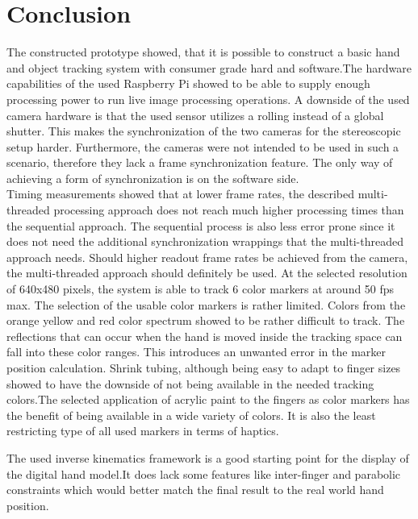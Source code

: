 \chapter{Conclusion}
The constructed prototype showed, that it is possible to construct a basic hand and object tracking system with consumer grade hard and software.The hardware capabilities of the used Raspberry Pi showed to be able to supply enough processing power to run live image processing operations. A downside of the used camera hardware is that the used sensor utilizes a rolling instead of a global shutter. This makes the synchronization of the two cameras for the stereoscopic setup harder. Furthermore, the cameras were not intended to be used in such a scenario, therefore they lack a frame synchronization feature. The only way of achieving a form of synchronization is on the software side.\\
Timing measurements showed that at lower frame rates, the described multi-threaded processing approach does not reach much higher processing times than the sequential approach. The sequential process is also less error prone since it does not need the additional synchronization wrappings that the multi-threaded approach needs. Should higher readout frame rates be achieved from the camera, the multi-threaded approach should definitely be used. At the selected resolution of 640x480 pixels, the system is able to track 6 color markers at around 50 fps max.
The selection of the usable color markers is rather limited. Colors from the orange yellow and red color spectrum showed to be rather difficult to track. The reflections that can occur when the hand is moved inside the tracking space can fall into these color ranges. This introduces an unwanted error in the marker position calculation.
Shrink tubing, although being easy to adapt to finger sizes showed to have the downside of not being available in the needed tracking colors.The selected application of acrylic paint to the fingers as color markers has the benefit of being available in a wide variety of colors. It is also the least restricting type of all used markers in terms of haptics.

The used inverse kinematics framework is  a good starting point for the display of the digital hand model.It does lack some features like inter-finger and parabolic constraints which would better match the final result to the real world hand position.

